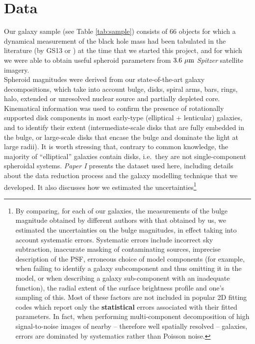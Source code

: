 \documentclass[preprint2]{emulateapj}
\begin{document}
\section{Data}
\label{sec:data}
Our galaxy sample (see Table \ref{tab:sample}) 
consists of 66 objects for which a dynamical measurement of the black hole mass had been tabulated in the literature 
(by GS13 or \citealt{rusli2013bhmassesDM}) at the time that we started this project, 
and for which we were able to obtain useful spheroid parameters from $3.6\rm~\mu m$ \emph{Spitzer} satellite imagery. \\
Spheroid magnitudes were derived from our state-of-the-art galaxy decompositions, which take into account 
bulge, disks, spiral arms, bars, rings, halo, extended or unresolved nuclear source and partially depleted core. 
Kinematical information \citep{atlas3dIII-MNRAS,scott2014,arnold2014} was used 
to confirm the presence of rotationally supported disk components in most early-type (elliptical + lenticular) galaxies, 
and to identify their extent 
(intermediate-scale disks that are fully embedded in the bulge, 
or large-scale disks that encase the bulge and dominate the light at large radii). 
It is worth stressing that, contrary to common knowledge, the majority of ``elliptical'' galaxies contain disks,
i.e.~they are not single-component spheroidal systems.
\emph{Paper I} presents the dataset used here, 
including details about the data reduction process and the galaxy modelling technique that we developed. 
It also discusses how we estimated the uncertainties\footnote{By comparing, for each of our galaxies, the measurements of the bulge magnitude 
obtained by different authors with that obtained by us, we estimated the uncertainties on the bulge magnitudes, 
in effect taking into account systematic errors. 
Systematic errors include incorrect sky subtraction, inaccurate masking of contaminating sources, imprecise description of the PSF, 
erroneous choice of model components (for example, when failing to identify a galaxy subcomponent and thus omitting it in the model, 
or when describing a galaxy sub-component with an inadequate function), 
the radial extent of the surface brightness profile and one's sampling of this. 
Most of these factors are not included in popular 2D fitting codes which report only the {\bf statistical} errors associated with their fitted parameters. 
In fact, when performing multi-component decomposition of high signal-to-noise images of nearby -- therefore well spatially resolved -- galaxies, 
errors are dominated by systematics rather than Poisson noise.} 
\end{document}
